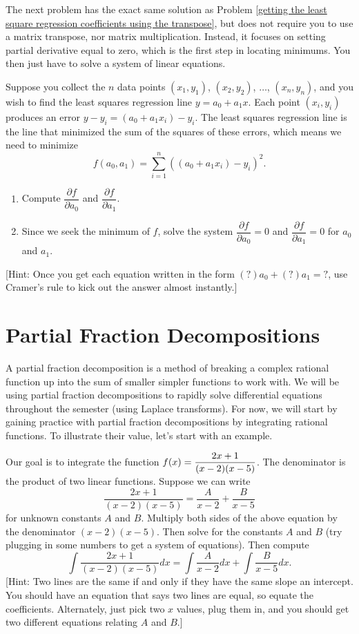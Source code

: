 The next problem has the exact same solution as Problem \ref{getting the least square regression coefficients using the transpose}, but does not require you to use a matrix transpose, nor matrix multiplication. Instead, it focuses on setting partial derivative equal to zero, which is the first step in locating minimums. You then just have to solve a system of linear equations. 
\begin{problem}
 Suppose you collect the $n$ data points $(x_1,y_1)$, $(x_2,y_2)$, $\ldots$, $(x_n,y_n)$, and you wish to find the least squares regression line $y=a_0+a_1x$. 
 Each point $(x_i,y_i)$ produces an error $y-y_i = (a_0+a_1x_i)-y_i$. The least squares regression line is the line that minimized the sum of the squares of these errors, which means we need to minimize $$f(a_0,a_1) = \sum_{i=1}^n \left((a_0+a_1x_i)-y_i\right)^2.$$
\begin{enumerate}
 \item Compute $\dfrac{\partial f}{\partial a_0}$ and $\dfrac{\partial f}{\partial a_1}$. 
 \item Since we seek the minimum of $f$, solve the system  $\dfrac{\partial f}{\partial a_0}=0$ and $\dfrac{\partial f}{\partial a_1}=0$ for $a_0$ and $a_1$.  
\end{enumerate}
[Hint: Once you get each equation written in the form $(?)a_0 +(?)a_1 = ?$, use Cramer's rule to kick out the answer almost instantly.]
\end{problem}


\section{Partial Fraction Decompositions}


A partial fraction decomposition is a method of breaking a complex rational function up into the sum of smaller simpler functions to work with. We will be using partial fraction decompositions to rapidly solve differential equations throughout the semester (using Laplace transforms).  For now, we will start by gaining practice with partial fraction decompositions by integrating rational functions. To illustrate their value, let's start with an example.

\begin{problem}
Our goal is to integrate the function 
$\displaystyle f(x)= \frac {2x+1}{(x-2) (x-5)}$. 
The denominator is the product of two linear functions. Suppose we can write
$$\frac {2x+1}{(x-2)(x-5)}=\frac {A}{x-2}+\frac{B}{x-5}$$
for unknown constants $A$ and $B$. 
Multiply both sides of the above equation by the denominator $(x-2)(x-5)$.  Then solve for the constants $A$ and $B$ (try plugging in some numbers to get a system of equations). Then compute 
$$
\int \frac {2x+1}{(x-2)(x-5)}dx=\int \frac {A}{x-2}dx +\int\frac{B}{x-5}dx.$$
[Hint: Two lines are the same if and only if they have the same slope an intercept.  You should have an equation that says two lines are equal, so equate the coefficients.  Alternately, just pick two $x$ values, plug them in, and you should get two different equations relating $A$ and $B$.]
\end{problem}


